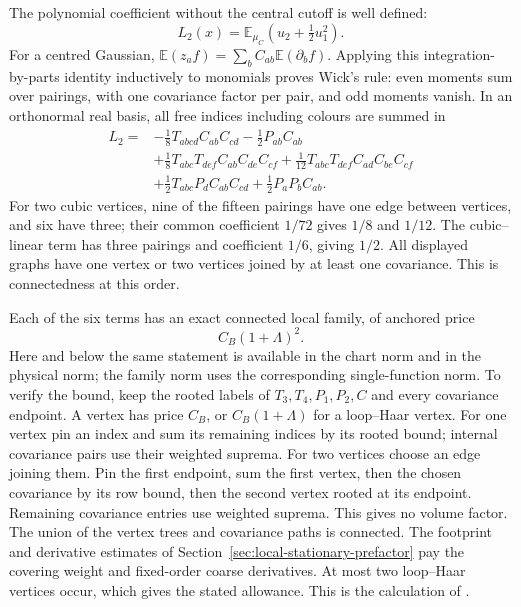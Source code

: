 \documentclass[11pt,reqno]{amsart}
\numberwithin{equation}{section}
\theoremstyle{definition}
\theoremstyle{remark}
\begin{document}
The polynomial coefficient without the central
cutoff is well defined:
\[
                    L_2(x)=\mathbb E_{\mu_C}
                                      (u_2+\tfrac12u_1^2).
\]
For a centred Gaussian,
\(\mathbb E(z_af)=\sum_bC_{ab}\mathbb E(\partial_bf)\).
Applying this integration-by-parts identity
inductively to monomials proves Wick's rule:
even moments sum over pairings, with one
covariance factor per pair, and odd moments vanish.
In an orthonormal real basis, all free indices
including colours are summed in
\begin{equation}
 \begin{split}
 L_2={}&-\tfrac18T_{abcd}C_{ab}C_{cd}
                  -\tfrac12P_{ab}C_{ab}\\
       &+\tfrac18T_{abc}T_{def}C_{ab}C_{de}C_{cf}
                  +\tfrac1{12}T_{abc}T_{def}C_{ad}C_{be}C_{cf}\\
       &+\tfrac12T_{abc}P_dC_{ab}C_{cd}
                  +\tfrac12P_aP_bC_{ab}.
 \end{split}
 \label{eq:connected-explicit-L2}
\end{equation}
For two cubic vertices, nine of the fifteen
pairings have one edge between vertices,
and six have three; their common coefficient
\(1/72\) gives \(1/8\) and \(1/12\).
The cubic--linear term has three pairings
and coefficient \(1/6\), giving \(1/2\).
All displayed graphs have one vertex or two
vertices joined by at least one covariance.
This is connectedness at this order.

Each of the six terms has an exact connected
local family, of anchored price
\begin{equation}
                              C_B(1+\Lambda)^2.
 \label{eq:connected-L2-family-price}
\end{equation}
Here and below the same statement is available
in the chart norm and in the physical norm;
the family norm uses the corresponding
single-function norm.
To verify the bound, keep the rooted labels
of \(T_3,T_4,P_1,P_2,C\) and every covariance
endpoint. A vertex has price \(C_B\), or
\(C_B(1+\Lambda)\) for a loop--Haar vertex.
For one vertex pin an index and sum its
remaining indices by its rooted bound;
internal covariance pairs use their
weighted suprema.
For two vertices choose an edge joining
them. Pin the first endpoint, sum the
first vertex, then the chosen covariance
by its row bound, then the second vertex
rooted at its endpoint.
Remaining covariance entries use weighted
suprema. This gives no volume factor.
The union of the vertex trees and
covariance paths is connected.
The footprint and derivative estimates of
Section~\ref{sec:local-stationary-prefactor}
pay the covering weight and fixed-order
coarse derivatives.
At most two loop--Haar vertices occur,
which gives the stated allowance.
This is the calculation of
\cite[Section~23.3, pp.~117--119]{Main}.
\end{document}
